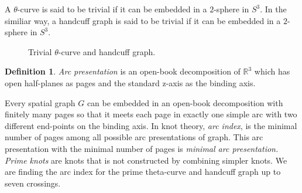 \documentclass{article}
\theoremstyle{definition}
\newtheorem{defn}[thm]{Definition}
\theoremstyle{theorem}
\theoremstyle{proposition}
\theoremstyle{corollary}
\begin{document}
A $\theta$-curve is said to be trivial if it can be embedded in a $2$-sphere in $S^3$.
In the similiar way, a handcuff graph is said to be trivial if it can be embedded in a $2$-sphere in $S^3$.

\begin{figure}[h]
    \centering
    \hspace{0.05\linewidth}
    \caption{Trivial $\theta$-curve and handcuff graph.}
    \label{figure_1} 
\end{figure}

\begin{defn}
    \textit{Arc presentation} is an open-book decomposition of $\mathbb{R}^3$ which has open half-planes as pages and the standard z-axis as the binding axis.
\end{defn}

Every spatial graph $G$ can be embedded in an open-book decomposition with finitely many pages so that it meets each page in exactly one simple arc with two different end-points on the binding axis.
In knot theory, \textit{arc index}, is the minimal number of pages among all possible arc presentations of graph. This arc presentation with the minimal number of pages is \textit{minimal arc presentation.} \textit{Prime knots} are knots that is not constructed by combining simpler knots. We are finding the arc index for the prime theta-curve and handcuff graph up to seven crossings.
\end{document}
